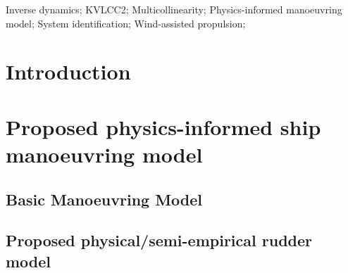 \documentclass[preprint,12pt,authoryear]{elsarticle}
\begin{document}
\begin{frontmatter}

    \begin{abstract}
        

    \end{abstract}


    \begin{keyword}
    Inverse dynamics; KVLCC2; Multicollinearity; Physics-informed manoeuvring model; System identification; Wind-assisted propulsion; 



    \end{keyword}

\end{frontmatter}
\section{Introduction}
\label{sec:introduction}

%
%
%
\section{Proposed physics-informed ship manoeuvring model}
\label{sec:ship_models}

\FloatBarrier
\subsection{Basic Manoeuvring Model}
\label{sec:models}

%
\subsection{Proposed physical/semi-empirical rudder model}
\label{sec:semiempirical_rudder_model}

%
\end{document}
